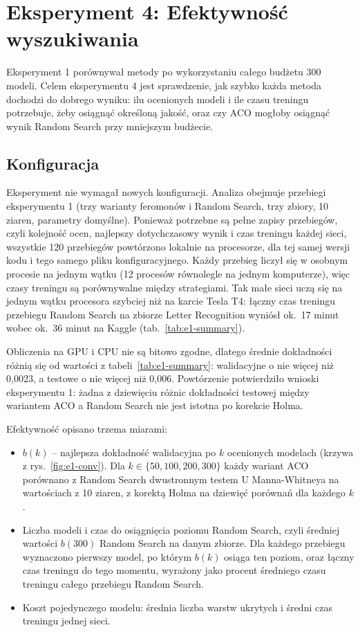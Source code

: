 \section{Eksperyment 4: Efektywność wyszukiwania}

Eksperyment 1 porównywał metody po wykorzystaniu całego budżetu 300 modeli. Celem
eksperymentu 4 jest sprawdzenie, jak szybko każda metoda dochodzi do dobrego wyniku:
ilu ocenionych modeli i ile czasu treningu potrzebuje, żeby osiągnąć określoną jakość,
oraz czy ACO mogłoby osiągnąć wynik Random Search przy mniejszym budżecie.

\subsection{Konfiguracja}

Eksperyment nie wymagał nowych konfiguracji. Analiza obejmuje przebiegi eksperymentu 1
(trzy warianty feromonów i Random Search, trzy zbiory, 10 ziaren, parametry domyślne).
Ponieważ potrzebne są pełne zapisy przebiegów, czyli kolejność ocen, najlepszy dotychczasowy
wynik i czas treningu każdej sieci, wszystkie 120 przebiegów powtórzono lokalnie na
procesorze, dla tej samej wersji kodu i tego samego pliku konfiguracyjnego. Każdy przebieg
liczył się w osobnym procesie na jednym wątku (12 procesów równolegle na jednym komputerze),
więc czasy treningu są porównywalne między strategiami. Tak małe sieci uczą się na jednym
wątku procesora szybciej niż na karcie Tesla T4: łączny czas treningu przebiegu Random Search
na zbiorze Letter Recognition wyniósł ok.~17 minut wobec ok.~36 minut na Kaggle
(tab.~\ref{tab:e1-summary}).

Obliczenia na GPU i CPU nie są bitowo zgodne, dlatego średnie dokładności różnią się od
wartości z tabeli~\ref{tab:e1-summary}: walidacyjne o nie więcej niż 0,0023, a testowe o nie
więcej niż 0,006. Powtórzenie potwierdziło
wnioski eksperymentu 1: żadna z dziewięciu różnic dokładności testowej między wariantem ACO
a Random Search nie jest istotna po korekcie Holma.

Efektywność opisano trzema miarami:
\begin{itemize}
    \item $b(k)$ -- najlepsza dokładność walidacyjna po $k$ ocenionych modelach (krzywa
    z rys.~\ref{fig:e1-conv}). Dla $k \in \{50, 100, 200, 300\}$ każdy wariant ACO porównano
    z Random Search dwustronnym testem U Manna-Whitneya na wartościach z 10 ziaren, z korektą
    Holma na dziewięć porównań dla każdego $k$.
    \item Liczba modeli i czas do osiągnięcia poziomu Random Search, czyli średniej wartości
    $b(300)$ Random Search na danym zbiorze. Dla każdego przebiegu wyznaczono pierwszy model,
    po którym $b(k)$ osiąga ten poziom, oraz łączny czas treningu do tego momentu, wyrażony
    jako procent średniego czasu treningu całego przebiegu Random Search.
    \item Koszt pojedynczego modelu: średnia liczba warstw ukrytych i średni czas treningu
    jednej sieci.
\end{itemize}

